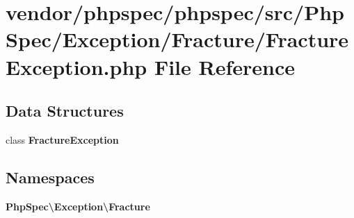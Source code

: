 \section{vendor/phpspec/phpspec/src/\+Php\+Spec/\+Exception/\+Fracture/\+Fracture\+Exception.php File Reference}
\label{_fracture_exception_8php}
\subsection*{Data Structures}
\begin{DoxyCompactItemize}
\item 
class {\bf Fracture\+Exception}
\end{DoxyCompactItemize}
\subsection*{Namespaces}
\begin{DoxyCompactItemize}
\item 
 {\bf Php\+Spec\textbackslash{}\+Exception\textbackslash{}\+Fracture}
\end{DoxyCompactItemize}
